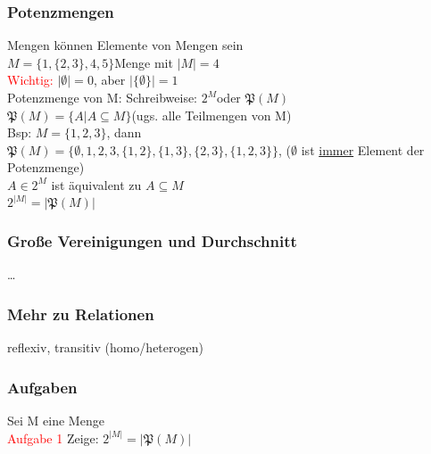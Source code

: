 \documentclass{beamer}
\begin{document}
	\begin{frame}
		\frametitle{Potenzmengen}
		Mengen können Elemente von Mengen sein\\
		$M = \{1, \{2, 3\}, 4, 5\} $Menge mit $\lvert M\rvert = 4$\\
		\textcolor{red}{Wichtig:} $\lvert \emptyset\rvert = 0$, aber $\lvert\{\emptyset\}\rvert = 1$\\
		Potenzmenge von M: Schreibweise: $2^M $oder $\mathfrak{P}(M)$\\
		$\mathfrak{P}(M) = \{ A\vert A\subseteq M\}$(ugs. alle Teilmengen von M)\\
		Bsp: $M = \{1, 2, 3\}$, dann\\
		$\mathfrak{P}(M) =\{\emptyset ,1, 2, 3, \{1, 2\}, \{1, 3\}, \{2, 3\}, \{1,2,3\}\}$, ($\emptyset$ ist \underline{immer} Element der Potenzmenge)\\
		$A\in 2^M$ ist äquivalent zu $A\subseteq M$\\
		$2^{\lvert M\rvert} = \lvert\mathfrak{P}(M)\rvert$
	\end{frame}
	\begin{frame}
		\frametitle{Große Vereinigungen und Durchschnitt}
		\dots%
	\end{frame}
	\begin{frame}
		\frametitle{Mehr zu Relationen}
		reflexiv, transitiv (homo/heterogen)
	\end{frame}
	\begin{frame}
		\frametitle{Aufgaben}
		Sei M eine Menge\\
		\textcolor{red}{Aufgabe 1} Zeige: $2^{\lvert M\rvert} = \lvert\mathfrak{P}(M)\rvert$\\
	\end{frame}
\end{document}
